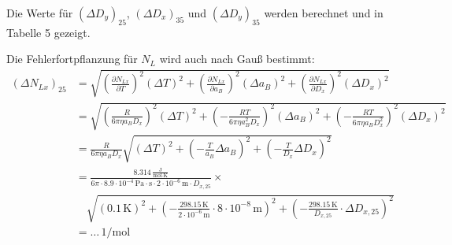 \documentclass[12pt,a4paper]{article}
\begin{document}
Die Werte für $(\Delta D_y)_{25}$, $(\Delta D_x)_{35}$ und $(\Delta D_y)_{35}$ werden berechnet und in Tabelle 5 gezeigt.

Die Fehlerfortpflanzung für $N_L$ wird auch nach Gauß bestimmt:
\begin{align*}
(\Delta N_{Lx})_{25} &= \sqrt{ \left( \frac{\partial N_{Lx}}{\partial T} \right)^2 (\Delta T)^2 + \left( \frac{\partial N_{Lx}}{\partial a_B} \right)^2 (\Delta a_B)^2 + \left( \frac{\partial N_{Lx}}{\partial D_x} \right)^2 (\Delta D_x)^2 } \\
&= \sqrt{ \left( \frac{R}{6\pi\eta a_B D_x} \right)^2 (\Delta T)^2 + \left( - \frac{RT}{6\pi\eta a_B^2 D_x} \right)^2 (\Delta a_B)^2 + \left( - \frac{RT}{6\pi\eta a_B D_x^2} \right)^2 (\Delta D_x)^2 } \\
&= \frac{R}{6\pi\eta a_B D_x} \sqrt{ (\Delta T)^2 + \left( - \frac{T}{a_B} \Delta a_B \right)^2 + \left( - \frac{T}{D_x} \Delta D_x \right)^2 } \\
&= \frac{8.314 \, \frac{\text{J}}{\text{mol}\cdot\text{K}}}{6\pi \cdot 8.9\cdot 10^{-4} \, \text{Pa}\cdot\text{s} \cdot 2\cdot 10^{-6} \, \text{m} \cdot D_{x,25}} \times \\
&\quad \sqrt{ (0.1 \, \text{K})^2 + \left( - \frac{298.15 \, \text{K}}{2\cdot 10^{-6} \, \text{m}} \cdot 8\cdot 10^{-8} \, \text{m} \right)^2 + \left( - \frac{298.15 \, \text{K}}{D_{x,25}} \cdot \Delta D_{x,25} \right)^2 } \\
&= \dots \, \text{1/mol}
\end{align*}
\end{document}
